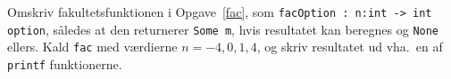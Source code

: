 Omskriv fakultetsfunktionen i Opgave~\ref{fac}, som \lstinline{facOption : n:int -> int option}, således at den returnerer \lstinline{Some m}, hvis resultatet kan beregnes og \lstinline{None} ellers. Kald \lstinline{fac} med værdierne $n=-4,0,1,4$, og skriv resultatet ud vha.\ en af \lstinline{printf} funktionerne.